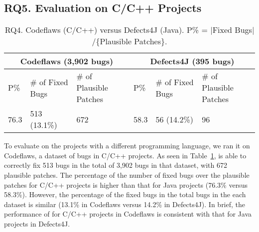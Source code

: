 \subsection{\bf RQ5. Evaluation on C/C++ Projects}
\label{sec:eval-c}

\begin{table}[t]
	\caption{RQ4. Codeflaws (C/C++) versus Defects4J (Java). P\% = $|$Fixed Bugs$|$/\{Plausible Patches\}.}
	\vspace{-5pt}
	{\footnotesize
		\begin{center}
			\tabcolsep 2.7pt
			\begin{tabular}{p{0.5cm}<{\centering}|p{1.5cm}<{\centering}|p{1.55cm}<{\centering}|p{0.5cm}<{\centering}|p{1.5cm}<{\centering}|p{1.55cm}<{\centering}}\hline	
				
				\multicolumn{3}{c|}{Codeflaws (3,902 bugs)} & \multicolumn{3}{c}{Defects4J (395 bugs)}\\\hline
				 P\%& \# of Fixed Bugs& \# of Plausible Patches &P\%& \# of Fixed Bugs & \# of Plausible Patches \\ \hline
				
				  76.3  &        513 (13.1\%)      &            672             &  58.3 &          56 (14.2\%)       &        96                 \\
				\hline

			\end{tabular}
			\label{RQ5}
		\end{center}
	}
\end{table}
  
To evaluate {\tool} on the projects with a different programming
language, we ran it on Codeflaws, a dataset of bugs in C/C++ projects.
As seen in Table~\ref{RQ5}, {\tool} is able to correctly fix 513 bugs
in the total of 3,902 bugs in that dataset, with 672 plausible
patches. The percentage of the number of fixed bugs over the plausible
patches for C/C++ projects is higher than that for Java projects
(76.3\% versus 58.3\%). However, the percentage of the fixed bugs in
the total bugs in the each dataset is similar (13.1\% in Codeflaws
versus 14.2\% in Defects4J). In brief, the performance of {\tool} for
C/C++ projects in Codeflaws is consistent with that for Java projects
in Defects4J.

